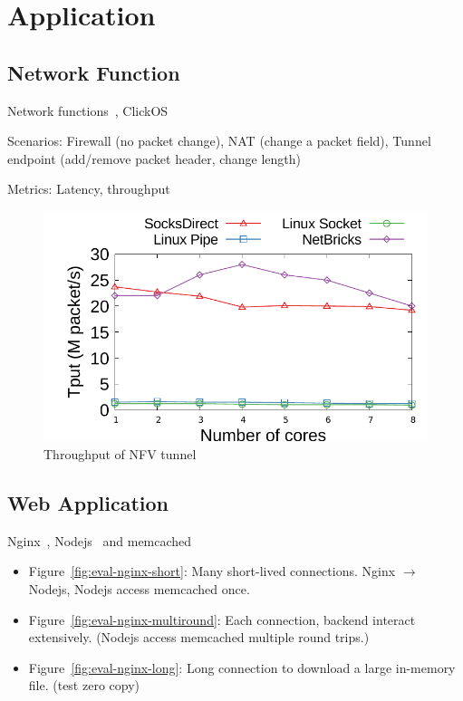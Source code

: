 \section{Application}
\label{sec:application}

\subsection{Network Function}

Network functions~\cite{li2016clicknp}, ClickOS~\cite{martins2014clickos}

Scenarios: Firewall (no packet change), NAT (change a packet field), Tunnel endpoint (add/remove packet header, change length)

Metrics: Latency, throughput

\begin{figure}[htpb]
	\centering
	\includegraphics[width=\columnwidth]{eval/microbenchmark/nfv-tun-tput.pdf}
	\caption{Throughput of NFV tunnel}
	\label{fig:eval-tun-tput}
\end{figure}



\subsection{Web Application}

Nginx~\cite{nginx}, Nodejs~\cite{nodejs} and memcached~\cite{memcached}

\begin{itemize}
	\item Figure~\ref{fig:eval-nginx-short}: Many short-lived connections. Nginx $\rightarrow$ Nodejs, Nodejs access memcached once.
	\item Figure~\ref{fig:eval-nginx-multiround}: Each connection, backend interact extensively. (Nodejs access memcached multiple round trips.)
	\item Figure~\ref{fig:eval-nginx-long}: Long connection to download a large in-memory file. (test zero copy)
\end{itemize}

